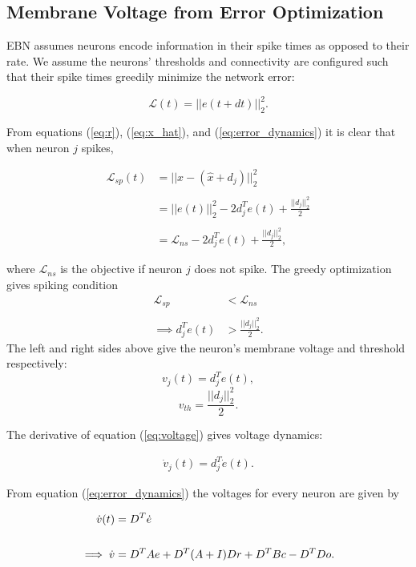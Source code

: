 \documentclass{article}
\begin{document}
\subsection{Membrane Voltage from Error Optimization}
EBN assumes neurons encode information in their spike times as opposed to their rate. We assume the neurons' thresholds and connectivity are configured such that their spike times greedily minimize the network error:

\begin{equation}
\mathcal{L}(t) = ||e(t + dt)||_2^2. 
\end{equation}

From equations (\ref{eq:r}), (\ref{eq:x_hat}), and (\ref{eq:error_dynamics}) it is clear that when neuron $j$ spikes, 

\begin{align*}
\mathcal{L}_{sp}(t)
&=
||x - (\hat{x} + d_j)||^2_2
\\
\\
&= 
||e(t)||_2^2 - 2 d_j^Te(t) + \frac{||d_j||^2_2}{2}
\\
\\
&=
\mathcal{L}_{ns} -2 d_j^Te(t) + \frac{||d_j||^2_2}{2},
\end{align*}

where $\mathcal{L}_{ns}$ is the objective if neuron $j$ does not spike. The greedy optimization gives spiking condition
\begin{align*}
\mathcal{L}_{sp} &< \mathcal{L}_{ns} 
\\
\\
\implies
d_j^T e(t) &> \frac{||d_j||^2_2}{2}.
\end{align*}
The left and right sides above give the neuron's membrane voltage and threshold respectively:
\begin{equation}
\label{eq:voltage}
v_j(t) = d_j^T e(t),
\end{equation}
\begin{equation}
v_{th} = \frac{||d_j||^2_2}{2}.
\end{equation}

The derivative of equation (\ref{eq:voltage}) gives voltage dynamics:

\begin{align*}
\dot{v}_j(t) = d_j^T \dot{e}(t).
\end{align*}

From equation (\ref{eq:error_dynamics}) the voltages for every neuron are given by 

\begin{align}
\label{eq:voltage_dynamics}
\dot{v}(t) &= D^T \dot{e} \notag
\\ \notag
\\ 
\implies
\dot{v}&=
D^TAe + D^T(A + I)Dr + D^TBc - D^TDo.
\end{align}
\end{document}
